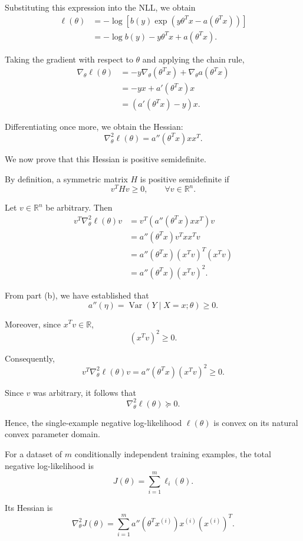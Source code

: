 \documentclass[10pt]{article}
\begin{document}
\begin{enumerate}
\begin{enumerate}[label=(\alph*)]
Substituting this expression into the NLL, we obtain
\[
\begin{aligned}
\ell(\theta)
&=-\log\left[
b(y)\exp\left(y\theta^Tx-a(\theta^Tx)\right)
\right]\\
&=-\log b(y)-y\theta^Tx+a(\theta^Tx).
\end{aligned}
\]

Taking the gradient with respect to $\theta$ and applying
the chain rule,
\[
\begin{aligned}
\nabla_\theta\ell(\theta)
&=-y\nabla_\theta(\theta^Tx)
+\nabla_\theta a(\theta^Tx)\\
&=-yx+a'(\theta^Tx)x\\
&=\left(a'(\theta^Tx)-y\right)x.
\end{aligned}
\]

Differentiating once more, we obtain the Hessian:
\[
\boxed{
\nabla_\theta^2\ell(\theta)
=
a''(\theta^Tx)xx^T.
}
\]

We now prove that this Hessian is positive semidefinite.

By definition, a symmetric matrix $H$ is positive
semidefinite if
\[
v^THv\geq 0,
\qquad \forall v\in\mathbb{R}^n.
\]

Let $v\in\mathbb{R}^n$ be arbitrary. Then
\[
\begin{aligned}
v^T\nabla_\theta^2\ell(\theta)v
&=v^T\left(a''(\theta^Tx)xx^T\right)v\\
&=a''(\theta^Tx)v^Txx^Tv\\
&=a''(\theta^Tx)(x^Tv)^T(x^Tv)\\
&=a''(\theta^Tx)(x^Tv)^2.
\end{aligned}
\]

From part (b), we have established that
\[
a''(\eta)
=
\operatorname{Var}(Y\mid X=x;\theta)\geq 0.
\]

Moreover, since $x^Tv\in\mathbb{R}$,
\[
(x^Tv)^2\geq 0.
\]

Consequently,
\[
\boxed{
v^T\nabla_\theta^2\ell(\theta)v
=
a''(\theta^Tx)(x^Tv)^2
\geq 0.
}
\]

Since $v$ was arbitrary, it follows that
\[
\boxed{
\nabla_\theta^2\ell(\theta)\succeq 0.
}
\]

Hence, the single-example negative log-likelihood
$\ell(\theta)$ is convex on its natural convex parameter domain.

For a dataset of $m$ conditionally independent training
examples, the total negative log-likelihood is
\[
J(\theta)
=
\sum_{i=1}^m
\ell_i(\theta).
\]

Its Hessian is
\[
\nabla_\theta^2J(\theta)
=
\sum_{i=1}^m
a''(\theta^Tx^{(i)})
x^{(i)}(x^{(i)})^T.
\]


\end{enumerate}
\end{enumerate}
\end{document}
